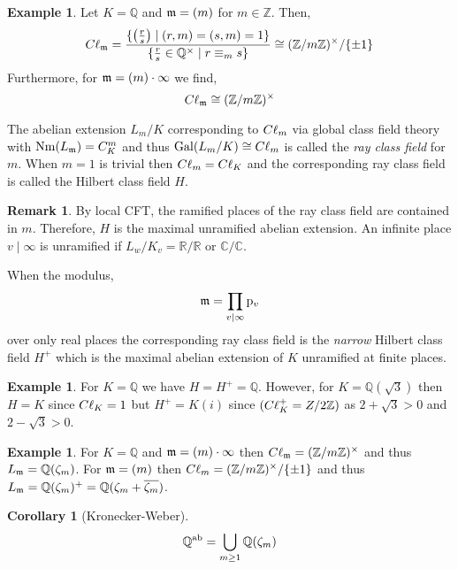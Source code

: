 \documentclass[12pt]{extarticle}
\newcommand{\divides}{\mid}
\newcommand{\Z}{\mathbb{Z}}
\newcommand{\C}{\mathbb{C}}
\newcommand{\Q}{\mathbb{Q}}
\newcommand{\R}{\mathbb{R}}
\theoremstyle{definition}
\newtheorem{corollary}[theorem]{Corollary}
\newtheorem{remark}[theorem]{Remark}
\newtheorem{example}[theorem]{Example}
\newenvironment{definition}[1][Definition:]{\begin{trivlist}
\item[\hskip \labelsep {\bfseries #1}]}{\end{trivlist}}
\begin{document}
\begin{example}
Let $K = \Q$ and $\mathfrak{m} = (m)$ for $m \in \Z$. Then,
\[ \Cl_{\m} = \frac{\{ \left( \frac{r}{s} \right) \mid (r,m) = (s,m) = 1 \}}{\{ \frac{r}{s} \in \Q^\times \mid r \equiv_m s \}} \cong (\Z / m \Z)^\times / \{ \pm  1 \} \]
Furthermore, for $\mathfrak{m} = (m) \cdot \infty$ we find,
\[ \Cl_\m  \cong (\Z / m \Z)^\times \]
\end{example}

\begin{definition}
The abelian extension $L_m / K$ corresponding to $C\ell_m$ via global class field theory with $\mathrm{Nm}(L_{\mathfrak{m}}) = C^m_K$ and thus $\mathrm{Gal} (L_m / K) \cong C\ell_m$ is called the \textit{ray class field} for $m$. When $m = 1$ is trivial then $C\ell_m = C\ell_K$ and the corresponding ray class field is called the Hilbert class field $H$.
\end{definition}

\begin{remark}
By local CFT, the ramified places of the ray class field are contained in $m$. Therefore, $H$ is the maximal unramified abelian extension. An infinite place $v \divides \infty$ is unramified if $L_w / K_v = \R / \R$ or $\C / \C$.   
\end{remark}

\begin{definition}
When the modulus,
\[ \m = \prod_{v \divides \infty} \p_v \]
over only real places the corresponding ray class field is the \textit{narrow} Hilbert class field $H^+$ which is the maximal abelian extension of $K$ unramified at finite places. 
\end{definition}

\begin{example}
For $K = \Q$ we have $H = H^+ = \Q$. However, for $K = \Q(\sqrt{3})$ then $H = K$ since $C\ell_K = 1$ but $H^+ = K(i)$ since $(\Cl_K^+ = Z / 2 \Z)$ as $2 + \sqrt{3} > 0$ and $2 - \sqrt{3} > 0$. 
\end{example}

\begin{example}
For $K = \Q$ and $\mathfrak{m} = (m) \cdot \infty$ then $\Cl_\m = (\Z / m \Z)^\times$ and thus $L_\m = \Q(\zeta_m)$. For $\mathfrak{m} = (m)$ then $\Cl_m = (\Z / m \Z)^{\times} / \{ \pm 1 \}$ and thus $L_\m = \Q(\zeta_m)^+ = \Q(\zeta_m + \overline{\zeta_m})$. 
\end{example}

\begin{corollary}[Kronecker-Weber]
\[ \Q^\ab = \bigcup_{m \ge 1} \Q(\zeta_m) \]
\end{corollary}
\end{document}
